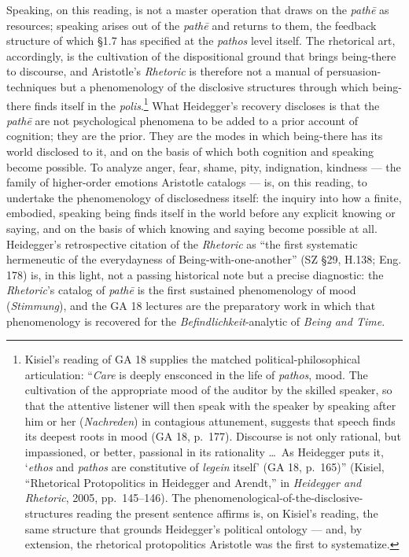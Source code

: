 \documentclass{article}
\begin{document}
Speaking, on this reading, is not a master operation that draws on the \textit{pathē} as resources; speaking arises out of the \textit{pathē} and returns to them, the feedback structure of which \S1.7 has specified at the \textit{pathos} level itself. The rhetorical art, accordingly, is the cultivation of the dispositional ground that brings being-there to discourse, and Aristotle's \textit{Rhetoric} is therefore not a manual of persuasion-techniques but a phenomenology of the disclosive structures through which being-there finds itself in the \textit{polis}.\footnote{Kisiel's reading of GA 18 supplies the matched political-philosophical articulation: ``\textit{Care} is deeply ensconced in the life of \textit{pathos}, mood. The cultivation of the appropriate mood of the auditor by the skilled speaker, so that the attentive listener will then speak with the speaker by speaking after him or her (\textit{Nachreden}) in contagious attunement, suggests that speech finds its deepest roots in mood (GA 18, p.~177). Discourse is not only rational, but impassioned, or better, passional in its rationality \ldots\ As Heidegger puts it, `\textit{ethos} and \textit{pathos} are constitutive of \textit{legein} itself' (GA 18, p.~165)'' (Kisiel, ``Rhetorical Protopolitics in Heidegger and Arendt,'' in \textit{Heidegger and Rhetoric}, 2005, pp.~145--146). The phenomenological-of-the-disclosive-structures reading the present sentence affirms is, on Kisiel's reading, the same structure that grounds Heidegger's political ontology --- and, by extension, the rhetorical protopolitics Aristotle was the first to systematize.} What Heidegger's recovery discloses is that the \textit{pathē} are not psychological phenomena to be added to a prior account of cognition; they are the prior. They are the modes in which being-there has its world disclosed to it, and on the basis of which both cognition and speaking become possible. To analyze anger, fear, shame, pity, indignation, kindness --- the family of higher-order emotions Aristotle catalogs --- is, on this reading, to undertake the phenomenology of disclosedness itself: the inquiry into how a finite, embodied, speaking being finds itself in the world before any explicit knowing or saying, and on the basis of which knowing and saying become possible at all. Heidegger's retrospective citation of the \textit{Rhetoric} as ``the first systematic hermeneutic of the everydayness of Being-with-one-another'' (SZ \S29, H.138; Eng. 178) is, in this light, not a passing historical note but a precise diagnostic: the \textit{Rhetoric}'s catalog of \textit{pathē} is the first sustained phenomenology of mood (\textit{Stimmung}), and the GA 18 lectures are the preparatory work in which that phenomenology is recovered for the \textit{Befindlichkeit}-analytic of \textit{Being and Time}.
\end{document}
